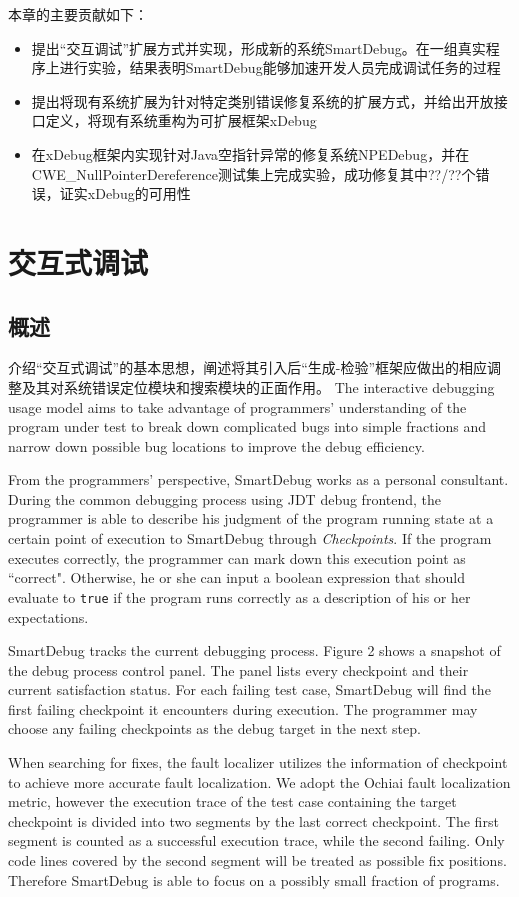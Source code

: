 本章的主要贡献如下：
\begin{itemize}
	\item 提出“交互调试”扩展方式并实现，形成新的系统SmartDebug。在一组真实程序上进行实验，结果表明SmartDebug能够加速开发人员完成调试任务的过程
	\item 提出将现有系统扩展为针对特定类别错误修复系统的扩展方式，并给出开放接口定义，将现有系统重构为可扩展框架xDebug
	\item 在xDebug框架内实现针对Java空指针异常的修复系统NPEDebug，并在CWE\_NullPointerDereference测试集上完成实验，成功修复其中??/??个错误，证实xDebug的可用性
\end{itemize}

\section{交互式调试}%
\subsection{概述}%
介绍“交互式调试”的基本思想，阐述将其引入后“生成-检验”框架应做出的相应调整及其对系统错误定位模块和搜索模块的正面作用。
The interactive debugging usage model aims to take advantage of programmers' understanding of the program under test to break down complicated bugs into simple fractions and narrow down possible bug locations to improve the debug efficiency.

From the programmers' perspective, SmartDebug works as a personal consultant. During the common debugging process using JDT debug frontend, the programmer is able to describe his judgment of the program running state at a certain point of execution to SmartDebug through \textit{Checkpoints}. If the program executes correctly, the programmer can mark down this execution point as ``correct". Otherwise, he or she can input a boolean expression that should evaluate to \texttt{true} if the program runs correctly as a description of his or her expectations.

SmartDebug tracks the current debugging process. Figure 2 shows a snapshot of the debug process control panel. The panel lists every checkpoint and their current satisfaction status. For each failing test case, SmartDebug will find the first failing checkpoint it encounters during execution. The programmer may choose any failing checkpoints as the debug target in the next step.

When searching for fixes, the fault localizer utilizes the information of checkpoint to achieve more accurate fault localization. We adopt the Ochiai\cite{Abreu:2006:ESC:1193217.1194368} fault localization metric, however the execution trace of the test case containing the target checkpoint is divided into two segments by the last correct checkpoint. The first segment is counted as a successful execution trace, while the second failing. Only code lines covered by the second segment will be treated as possible fix positions. Therefore SmartDebug is able to focus on a possibly small fraction of programs.


